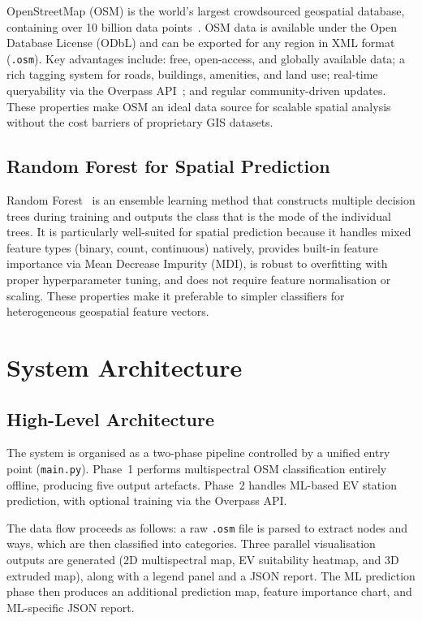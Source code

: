 \documentclass[conference]{IEEEtran}
\begin{document}
OpenStreetMap (OSM) is the world's largest crowdsourced geospatial database, containing over 10 billion data points~\cite{b2}. OSM data is available under the Open Database License (ODbL) and can be exported for any region in XML format (\texttt{.osm}). Key advantages include: free, open-access, and globally available data; a rich tagging system for roads, buildings, amenities, and land use; real-time queryability via the Overpass API~\cite{b3}; and regular community-driven updates. These properties make OSM an ideal data source for scalable spatial analysis without the cost barriers of proprietary GIS datasets.

\subsection{Random Forest for Spatial Prediction}

Random Forest~\cite{b5} is an ensemble learning method that constructs multiple decision trees during training and outputs the class that is the mode of the individual trees. It is particularly well-suited for spatial prediction because it handles mixed feature types (binary, count, continuous) natively, provides built-in feature importance via Mean Decrease Impurity (MDI), is robust to overfitting with proper hyperparameter tuning, and does not require feature normalisation or scaling. These properties make it preferable to simpler classifiers for heterogeneous geospatial feature vectors.


\section{System Architecture}

\subsection{High-Level Architecture}

The system is organised as a two-phase pipeline controlled by a unified entry point (\texttt{main.py}). Phase~1 performs multispectral OSM classification entirely offline, producing five output artefacts. Phase~2 handles ML-based EV station prediction, with optional training via the Overpass API.

The data flow proceeds as follows: a raw \texttt{.osm} file is parsed to extract nodes and ways, which are then classified into categories. Three parallel visualisation outputs are generated (2D multispectral map, EV suitability heatmap, and 3D extruded map), along with a legend panel and a JSON report. The ML prediction phase then produces an additional prediction map, feature importance chart, and ML-specific JSON report.
\end{document}
